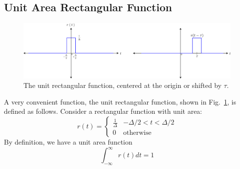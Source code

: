 \subsection{Unit Area Rectangular Function}
\begin{figure}[tb]
\begin{center}
\includegraphics[width=1\columnwidth]{rect_func}
\end{center}
\caption{The unit rectangular function, centered at the origin or shifted by $\tau$. }
\label{fig:fun_rect}
\end{figure}
A very convenient function, the unit rectangular function, shown in Fig.~\ref{fig:fun_rect}, is defined as follows.  Consider a rectangular function with unit area:
    \begin{equation}
        r(t) = \left\{ 
        \begin{array}{cc} 
        \frac{1}{\Delta} & -\Delta/2 < t < \Delta/2 \\ 
        0  & \mathrm{otherwise} 
        \end{array} \right.
    \end{equation}
 By definition, we have a unit area function
    \begin{equation}
        \int_{-\infty}^{\infty} r(t) dt = 1
    \end{equation}
